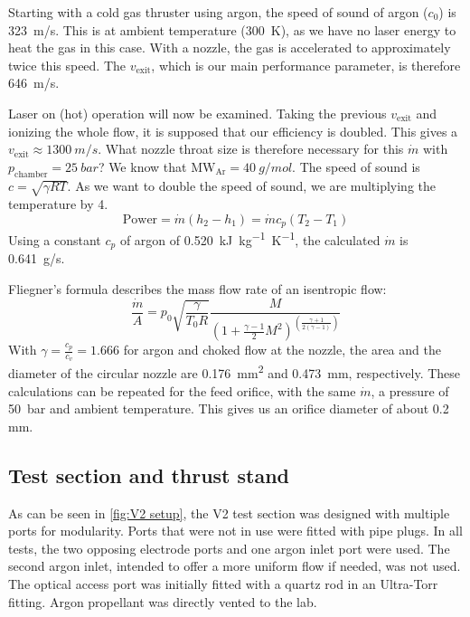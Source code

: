             Starting with a cold gas thruster using argon, the speed of sound of argon ($c_0$) is \qty{323}{m/s}. This is at ambient temperature (\qty{300}{K}), as we have no laser energy to heat the gas in this case. With a nozzle, the gas is accelerated to approximately twice this speed. The $v_\mathrm{exit}$, which is our main performance parameter, is therefore \qty{646}{m/s}.
            
            Laser on (hot) operation will now be examined. Taking the previous $v_\mathrm{exit}$ and ionizing the whole flow, it is supposed that our efficiency is doubled. This gives a $v_\mathrm{exit}\approx \qty{1300}{m/s}$. What nozzle throat size is therefore necessary for this $\dot m$ with $p_\mathrm{chamber} = \qty{25}{bar}$? We know that $\mathrm{MW_{Ar}} = \qty{40}{g/mol}$. The speed of sound is $c = \sqrt{\gamma R T}$. As we want to double the speed of sound, we are multiplying the temperature by 4.
            \[\text{Power} = \dot m (h_2-h_1)
            = \dot m c_p (T_2-T_1)\]
            Using a constant $c_p$ of argon of \qty{0.520}{kJ.kg^{-1}.K^{-1}}, the calculated $\dot m$ is \qty{0.641}{g/s}.
            
            Fliegner's formula describes the mass flow rate of an isentropic flow:
            \[\frac{\dot m}{A} = p_0\sqrt{\frac{\gamma}{T_0 R}}\frac{M}{(1+\frac{\gamma-1}{2}M^2)^{(\frac{\gamma+1}{2(\gamma-1)})}}\]
            With $\gamma = \frac{c_p}{c_v} = 1.666$ for argon and choked flow at the nozzle, the area and the diameter of the circular nozzle are \qty{0.176}{mm^2} and \qty{0.473}{mm}, respectively. These calculations can be repeated for the feed orifice, with the same $\dot m$, a pressure of \qty{50}{bar} and ambient temperature. This gives us an orifice diameter of about 0.2 mm.
        
        \subsection{Test section and thrust stand}
            
            As can be seen in \autoref{fig:V2 setup}, the V2 test section was designed with multiple ports for modularity. Ports that were not in use were fitted with pipe plugs. In all tests, the two opposing electrode ports and one argon inlet port were used. The second argon inlet, intended to offer a more uniform flow if needed, was not used. The optical access port was initially fitted with a quartz rod in an Ultra-Torr fitting. Argon propellant was directly vented to the lab.

